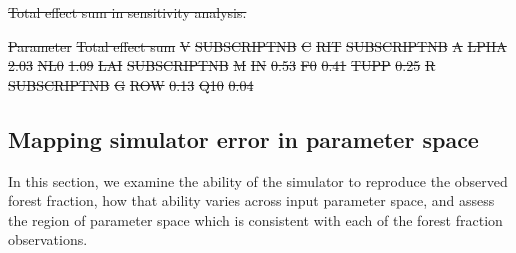 \documentclass[esd, manuscript]{copernicus}
\providecommand{\DIFdel}[1]{{\protect\color{red}\sout{#1}}}                      %
\providecommand{\DIFdelbegin}{} %
\providecommand{\DIFdelend}{} %
\begin{document}
\DIFdelbegin %
{%
\DIFdel{Total effect sum in sensitivity analysis.}}%

\DIFdel{Parameter }%
\DIFdel{Total effect sum }%
\DIFdel{V}%
\DIFdel{SUBSCRIPTNB}%
\DIFdel{C}%
\DIFdel{RIT}%
\DIFdel{SUBSCRIPTNB}%
\DIFdel{A}%
\DIFdel{LPHA }%
\DIFdel{2.03 }%
\DIFdel{NL0 }%
\DIFdel{1.09 }%
\DIFdel{LAI}%
\DIFdel{SUBSCRIPTNB}%
\DIFdel{M}%
\DIFdel{IN }%
\DIFdel{0.53 }%
\DIFdel{F0 }%
\DIFdel{0.41 }%
\DIFdel{TUPP }%
\DIFdel{0.25 }%
\DIFdel{R}%
\DIFdel{SUBSCRIPTNB}%
\DIFdel{G}%
\DIFdel{ROW  }%
\DIFdel{0.13 }%
\DIFdel{Q10 }%
\DIFdel{0.04 }%


\DIFdelend \subsection{Mapping simulator error in parameter space}\label{ssec:mapping}

In this section, we examine the ability of the simulator to reproduce the observed forest fraction, how that ability varies across input parameter space, and assess the region of parameter space which is consistent with each of the forest fraction observations.
\end{document}
